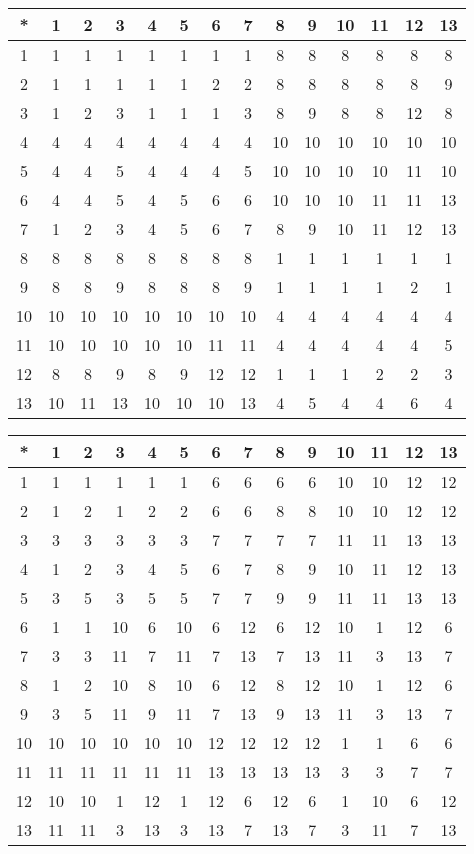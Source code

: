 \begin{tabular}[t]{c|ccccccccccccc}
*&1&2&3&4&5&6&7&8&9&10&11&12&13 \\ \hline
    1&1&1&1&1&1&1&1&8&8&8&8&8&8 \\
    2&1&1&1&1&1&2&2&8&8&8&8&8&9 \\
    3&1&2&3&1&1&1&3&8&9&8&8&12&8 \\
    4&4&4&4&4&4&4&4&10&10&10&10&10&10 \\
    5&4&4&5&4&4&4&5&10&10&10&10&11&10 \\
    6&4&4&5&4&5&6&6&10&10&10&11&11&13 \\
    7&1&2&3&4&5&6&7&8&9&10&11&12&13 \\
    8&8&8&8&8&8&8&8&1&1&1&1&1&1 \\
    9&8&8&9&8&8&8&9&1&1&1&1&2&1 \\
    10&10&10&10&10&10&10&10&4&4&4&4&4&4 \\
    11&10&10&10&10&10&11&11&4&4&4&4&4&5 \\
    12&8&8&9&8&9&12&12&1&1&1&2&2&3 \\
    13&10&11&13&10&10&10&13&4&5&4&4&6&4 
\end{tabular}


\begin{tabular}[t]{c|ccccccccccccc}
*&1&2&3&4&5&6&7&8&9&10&11&12&13 \\ \hline
    1&1&1&1&1&1&6&6&6&6&10&10&12&12 \\
    2&1&2&1&2&2&6&6&8&8&10&10&12&12 \\
    3&3&3&3&3&3&7&7&7&7&11&11&13&13 \\
    4&1&2&3&4&5&6&7&8&9&10&11&12&13 \\
    5&3&5&3&5&5&7&7&9&9&11&11&13&13 \\
    6&1&1&10&6&10&6&12&6&12&10&1&12&6 \\
    7&3&3&11&7&11&7&13&7&13&11&3&13&7 \\
    8&1&2&10&8&10&6&12&8&12&10&1&12&6 \\
    9&3&5&11&9&11&7&13&9&13&11&3&13&7 \\
    10&10&10&10&10&10&12&12&12&12&1&1&6&6 \\
    11&11&11&11&11&11&13&13&13&13&3&3&7&7 \\
    12&10&10&1&12&1&12&6&12&6&1&10&6&12 \\
    13&11&11&3&13&3&13&7&13&7&3&11&7&13 
\end{tabular}


